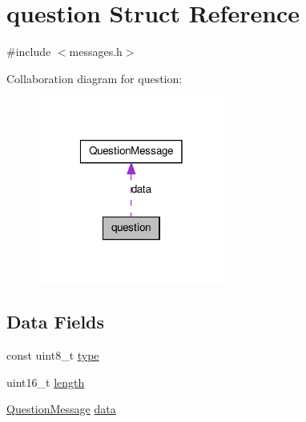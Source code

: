\hypertarget{structquestion}{
\section{question Struct Reference}
\label{structquestion}
}


{\ttfamily \#include $<$messages.h$>$}



Collaboration diagram for question:
\nopagebreak
\begin{figure}[H]
\begin{center}
\leavevmode
\includegraphics[width=174pt]{structquestion__coll__graph}
\end{center}
\end{figure}
\subsection*{Data Fields}
\begin{DoxyCompactItemize}
\item 
const uint8\_\-t \hyperlink{structquestion_aca7dafb0092715a03dd40f45fc607f2a}{type}
\item 
uint16\_\-t \hyperlink{structquestion_a1892eba2086d12ac2b09005aeb09ea3b}{length}
\item 
\hyperlink{struct_question_message}{QuestionMessage} \hyperlink{structquestion_a17a102c002c052d9c66ef8eee24429d7}{data}
\end{DoxyCompactItemize}


